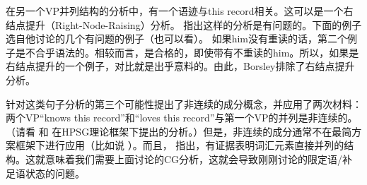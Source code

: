 在另一个VP并列结构的分析中，有一个语迹与this record相关。这可以是一个右结点提升（Right-Node-Raising）分析。 \citet{Borsley2005a}指出这样的分析是有问题的。下面的例子选自他讨论的几个有问题的例子（也可以看\citealp[]{Bresnan74a-u}）。
\eal
{}
\zl
如果him没有重读的话，第二个例子是不合乎语法的。相较而言，是合格的，即使带有不重读的him。所以，如果是右结点提升的一个例子，对比就是出乎意料的。由此，Borsley排除了右结点提升分析。

针对这类句子分析的第三个可能性提出了非连续的成分概念，并应用了两次材料：两个VP“knows this record”和“loves this record”与第一个VP的并列是非连续的。（请看 和 在HPSG理论框架下提出的分析。）但是，非连续的成分通常不在最简方案框架下进行应用（比如说 ）。而且， \citet{Abeille2006a}指出，有证据表明词汇元素直接并列的结构。这就意味着我们需要上面讨论的CG分析，这就会导致刚刚讨论的限定语/补足语状态的问题。

